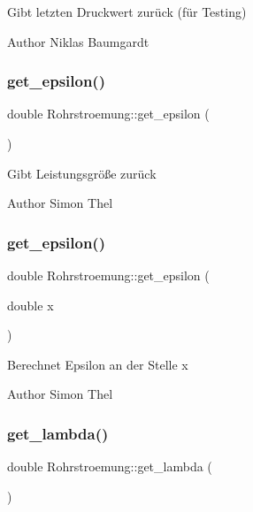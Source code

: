 Gibt letzten Druckwert zurück (für Testing) \begin{DoxyAuthor}{Author}
Niklas Baumgardt 
\end{DoxyAuthor}
\mbox{\label{class_rohrstroemung_a47b2ddadb37169a3a21bcc914a772894}} 
\subsubsection{\texorpdfstring{get\+\_\+epsilon()}{get\_epsilon()}\hspace{0.1cm}{\footnotesize\ttfamily [1/2]}}
{\footnotesize\ttfamily double Rohrstroemung\+::get\+\_\+epsilon (\begin{DoxyParamCaption}{ }\end{DoxyParamCaption})}

Gibt Leistungsgröße zurück \begin{DoxyAuthor}{Author}
Simon Thel 
\end{DoxyAuthor}
\mbox{\label{class_rohrstroemung_ab3a28b86a6a2d630a4c37f0054fb0288}} 
\subsubsection{\texorpdfstring{get\+\_\+epsilon()}{get\_epsilon()}\hspace{0.1cm}{\footnotesize\ttfamily [2/2]}}
{\footnotesize\ttfamily double Rohrstroemung\+::get\+\_\+epsilon (\begin{DoxyParamCaption}\item[{double}]{x }\end{DoxyParamCaption})}

Berechnet Epsilon an der Stelle x \begin{DoxyAuthor}{Author}
Simon Thel 
\end{DoxyAuthor}
\mbox{\label{class_rohrstroemung_a7ea25aca94625ef68bf856d957419d26}} 
\subsubsection{\texorpdfstring{get\+\_\+lambda()}{get\_lambda()}}
{\footnotesize\ttfamily double Rohrstroemung\+::get\+\_\+lambda (\begin{DoxyParamCaption}{ }\end{DoxyParamCaption})}

